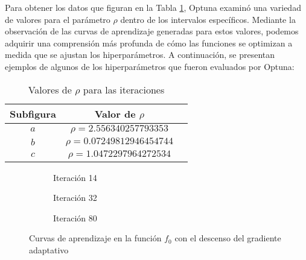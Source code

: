 Para obtener los datos que figuran en la Tabla \ref{tab:valores-rho-adaptativo}, Optuna examinó una variedad de valores para el parámetro $\rho$ dentro de los intervalos específicos. Mediante la observación de las curvas de aprendizaje generadas para estos valores, podemos adquirir una comprensión más profunda de cómo las funciones se optimizan a medida que se ajustan los hiperparámetros. A continuación, se presentan ejemplos de algunos de los hiperparámetros que fueron evaluados por Optuna:
\clearpage
\begin{table}[H]
    \centering
    \caption{Valores de $\rho$ para las iteraciones}
    \begin{tabular}{|c|c|c|}
    \hline
    \textbf{Subfigura} & \textbf{Valor de $\rho$} \\
    \hline
    $a$ & $\rho = 2.556340257793353 $ \\
    \hline
    $b$ & $\rho = 0.07249812946454744 $ \\
    \hline
    $c$ & $\rho =  1.0472297964272534$ \\
    \hline
    \end{tabular}
    \label{tab:valores-rho-adaptativo}
\end{table}

\begin{figure}[h!]
     \centering
     \begin{subfigure}[b]{0.45\textwidth}
         \centering
         
         \caption{Iteración 14}
         \label{fig:learning-adagrad-f0-14}
     \end{subfigure}
     \hfill
     \begin{subfigure}[b]{0.45\textwidth}
         \centering
         
         \caption{Iteración 32}
         \label{fig:learning-adagrad-f0-32}
     \end{subfigure}
     \hfill
     \begin{subfigure}[b]{0.45\textwidth}
         \centering
         
         \caption{Iteración 80}
         \label{fig:learning-adagrad-f0-80}
     \end{subfigure}
        \caption{Curvas de aprendizaje en la función $f_0$ con el descenso del gradiente adaptativo}
        \label{fig:learning-curves-adagrad-f0}
\end{figure}


